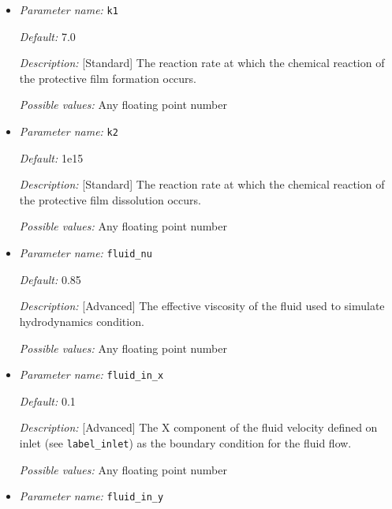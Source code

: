 \begin{itemize}
\item {\it Parameter name:} {\tt k1}
\label{parameters:k1}


{\it Default:} 7.0

{\it Description:} [Standard] The reaction rate at which the chemical reaction of the protective film formation occurs.

{\it Possible values:} Any floating point number


\item {\it Parameter name:} {\tt k2}
\label{parameters:k2}


{\it Default:} 1e15

{\it Description:} [Standard] The reaction rate at which the chemical reaction of the protective film dissolution occurs.

{\it Possible values:} Any floating point number


\item {\it Parameter name:} {\tt fluid\_nu}
\label{parameters:fluid_nu}


{\it Default:} 0.85

{\it Description:} [Advanced] The effective viscosity of the fluid used to simulate hydrodynamics condition.

{\it Possible values:} Any floating point number


\item {\it Parameter name:} {\tt fluid\_in\_x}
\label{parameters:fluid_in_x}


{\it Default:} 0.1

{\it Description:} [Advanced] The X component of the fluid velocity defined on inlet (see {\tt label\_inlet}) as the boundary condition for the fluid flow.

{\it Possible values:} Any floating point number


\item {\it Parameter name:} {\tt fluid\_in\_y}
\label{parameters:fluid_in_y}


\end{itemize}
